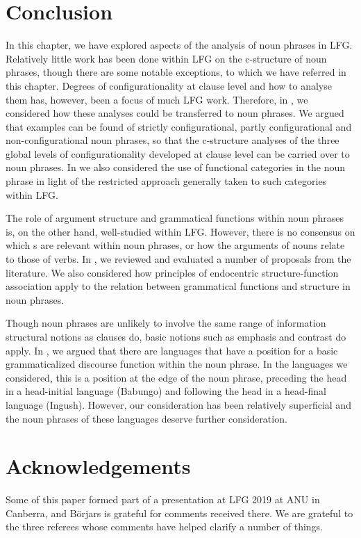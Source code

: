 \documentclass[output=paper,hidelinks]{langscibook}
\begin{document}
\section{Conclusion}

In this chapter, we have explored aspects of the analysis of noun phrases in LFG. Relatively little work has been done within LFG on the c-structure of noun phrases, though there are some notable exceptions, to which we have referred in this chapter. Degrees of configurationality at clause level and how to analyse them has, however, been a focus of much LFG work. Therefore, in , we considered how these analyses could be transferred to noun phrases. We argued that examples can be found of strictly configurational, partly configurational and non-configurational noun phrases, so that the c-structure analyses of the three global levels of configurationality developed at clause level can be carried over to noun phrases. In  we also considered the use of functional categories in the noun phrase in light of the restricted approach generally taken to such categories within LFG.

\hspace*{-1mm}The role of argument structure and grammatical functions within noun phrases is, on the other hand, well-studied within LFG. However, there is no consensus on which {\GF}s are relevant within noun phrases, or how the arguments of nouns relate to those of verbs. In , we reviewed and evaluated a number of proposals from the literature. We also considered how principles of endocentric structure-function association \citep[105, 117]{BresnanEtAl2016} apply to the relation between grammatical functions and structure in noun phrases.

Though noun phrases are unlikely to involve the same range of information structural notions as clauses do, basic notions such as emphasis and contrast do apply. In , we argued that there are languages that have a position for a basic grammaticalized discourse function within the noun phrase. In the languages we considered, this is a position at the edge of the noun phrase, preceding the head in a head-initial language (Babungo) and following the head in a head-final language (Ingush). However, our consideration has been relatively superficial and the noun phrases of these languages deserve further consideration. 


\section*{Acknowledgements}

Some of this paper formed part of a presentation at LFG 2019 at ANU in Canberra, and Börjars is grateful for comments received there. We are grateful to the three referees whose comments have helped clarify a number of things.

\sloppy
\printbibliography[heading=subbibliography,notkeyword=this]
\end{document}
